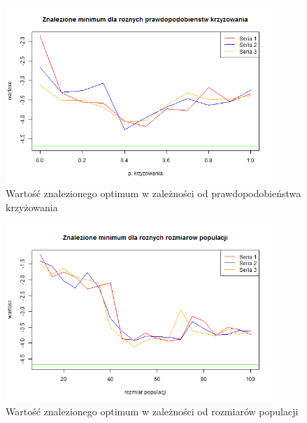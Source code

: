 \documentclass[11pt, a4paper]{article}
\begin{document}
\begin{figure}[H]
	\begin{center}
		\includegraphics[width=0.9\textwidth]{./assets/EMichalewicz3.png} %
		\caption{Wartość znalezionego optimum w zależności od prawdopodobieństwa krzyżowania}
		\label{fig:emichalewicz3}
	\end{center}
\end{figure}

\begin{figure}[H]
	\begin{center}
		\includegraphics[width=0.9\textwidth]{./assets/EMichalewicz4.png} %
		\caption{Wartość znalezionego optimum w zależności od rozmiarów populacji}
		\label{fig:emichalewicz4}
	\end{center}
\end{figure}
\end{document}
